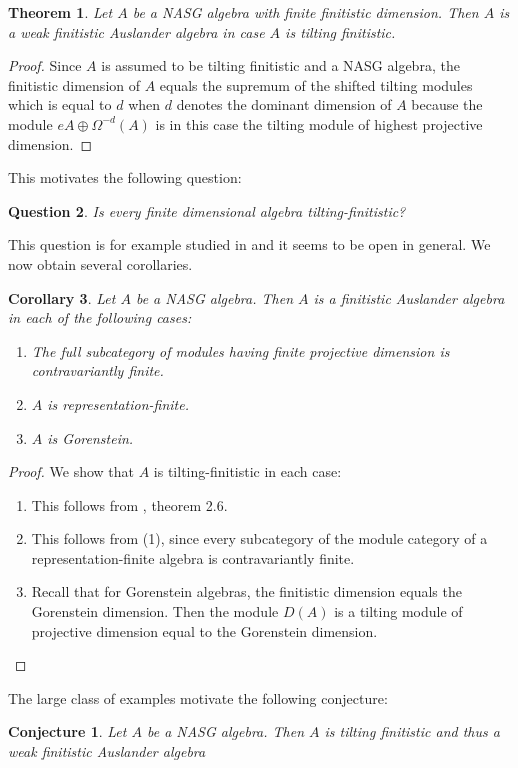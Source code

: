 \documentclass[a4paper]{amsart}
\newtheorem{theorem}{Theorem}[section]
\newtheorem{corollary}[theorem]{Corollary}
\newtheorem{question}[theorem]{Question}
\newtheorem*{conjecture}{Conjecture}
\theoremstyle{definition}
\theoremstyle{remark}
\numberwithin{equation}{theorem}
\begin{document}
\begin{theorem} \label{nasgtheo}
Let $A$ be a NASG algebra with finite finitistic dimension. Then $A$ is a weak finitistic Auslander algebra in case $A$ is tilting finitistic.

\end{theorem}
\begin{proof}
Since $A$ is assumed to be tilting finitistic and a NASG algebra, the finitistic dimension of $A$ equals the supremum of the shifted tilting modules which is equal to $d$ when $d$ denotes the dominant dimension of $A$ because the module $eA \oplus \Omega^{-d}(A)$ is in this case the tilting module of highest projective dimension. 
\end{proof}
This motivates the following question:
\begin{question}
Is every finite dimensional algebra tilting-finitistic?
\end{question}
This question is for example studied in \cite{AT} and it seems to be open in general.
We now obtain several corollaries.
\begin{corollary} \label{nasgcorollary}
Let $A$ be a NASG algebra. Then $A$ is a finitistic Auslander algebra in each of the following cases:
\begin{enumerate}
\item The full subcategory of modules having finite projective dimension is contravariantly finite.
\item $A$ is representation-finite.
\item $A$ is Gorenstein.
\end{enumerate}
\end{corollary}
\begin{proof}
We show that $A$ is tilting-finitistic in each case:
\begin{enumerate}
\item This follows from \cite{AT}, theorem 2.6.
\item This follows from (1), since every subcategory of the module category of a representation-finite algebra is contravariantly finite.
\item Recall that for Gorenstein algebras, the finitistic dimension equals the Gorenstein dimension. Then the module $D(A)$ is a tilting module of projective dimension equal to the Gorenstein dimension.
\end{enumerate}

\end{proof}
The large class of examples motivate the following conjecture:
\begin{conjecture} \label{nasgconjecture}
Let $A$ be a NASG algebra. 
Then $A$ is tilting finitistic and thus a weak finitistic Auslander algebra 
\end{conjecture}
\end{document}
